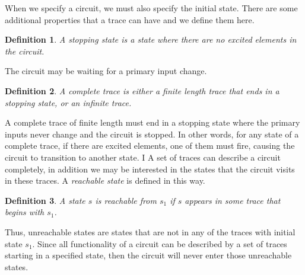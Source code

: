 \documentclass[12pt]{report}
\newtheorem*{definition}{Definition}
\begin{document}
When we specify a circuit, we must also specify the initial state.  
There are some additional properties that a trace can have and we define them here.
\begin{definition}
A {\em stopping state} is a state where there are no excited elements in the circuit. 
\end{definition} 
 The circuit may be waiting for a primary input change.
\begin{definition}
A {\em complete trace} is either a finite length trace that ends in a stopping state, or an infinite trace.
\end{definition}
A complete trace of finite length must end in a stopping state where the primary inputs never change and the circuit is stopped.  In other words, for any state of a complete trace, if there are excited elements, one of them must fire, causing the circuit to transition to another state.
I%
A set of traces can describe a circuit completely, in addition we may be interested in the states that the circuit visits in these traces. 
A {\em reachable state} is defined in this way.
\begin{definition}
A state $s$ is {\em reachable} from $s_1$ if $s$ appears in some trace that begins with $s_1$.
\end{definition}
Thus, unreachable states are states that are not in any of the traces with initial state $s_1$.  Since all functionality of a circuit can be described by a set of traces starting in a specified state, then the circuit will never enter those unreachable states. 
\end{document}
